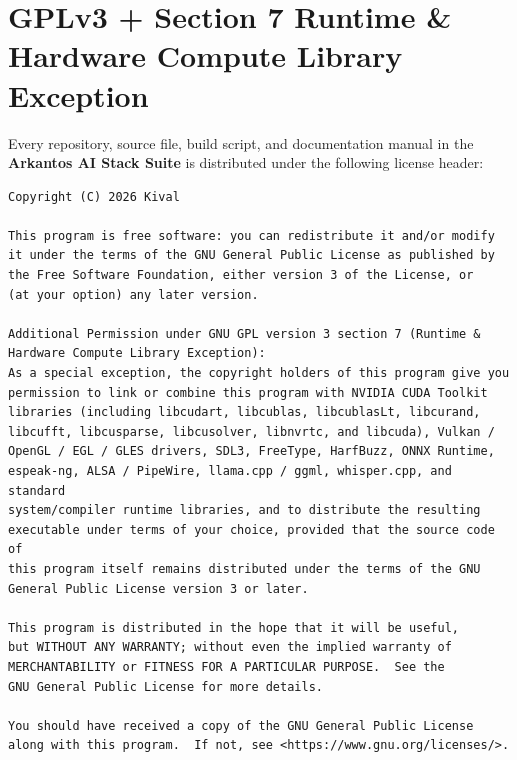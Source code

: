 \documentclass[11pt,a4paper]{article}
\begin{document}
\section{GPLv3 + Section 7 Runtime \& Hardware Compute Library Exception}

Every repository, source file, build script, and documentation manual in the \textbf{Arkantos AI Stack Suite} is distributed under the following license header:

\begin{lstlisting}
Copyright (C) 2026 Kival

This program is free software: you can redistribute it and/or modify
it under the terms of the GNU General Public License as published by
the Free Software Foundation, either version 3 of the License, or
(at your option) any later version.

Additional Permission under GNU GPL version 3 section 7 (Runtime &
Hardware Compute Library Exception):
As a special exception, the copyright holders of this program give you
permission to link or combine this program with NVIDIA CUDA Toolkit
libraries (including libcudart, libcublas, libcublasLt, libcurand,
libcufft, libcusparse, libcusolver, libnvrtc, and libcuda), Vulkan /
OpenGL / EGL / GLES drivers, SDL3, FreeType, HarfBuzz, ONNX Runtime,
espeak-ng, ALSA / PipeWire, llama.cpp / ggml, whisper.cpp, and standard
system/compiler runtime libraries, and to distribute the resulting
executable under terms of your choice, provided that the source code of
this program itself remains distributed under the terms of the GNU
General Public License version 3 or later.

This program is distributed in the hope that it will be useful,
but WITHOUT ANY WARRANTY; without even the implied warranty of
MERCHANTABILITY or FITNESS FOR A PARTICULAR PURPOSE.  See the
GNU General Public License for more details.

You should have received a copy of the GNU General Public License
along with this program.  If not, see <https://www.gnu.org/licenses/>.
\end{lstlisting}

\end{document}

